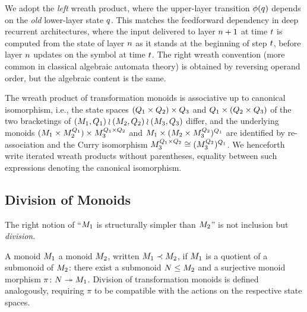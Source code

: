 \documentclass{article}
\begin{document}
\begin{remark}
We adopt the \emph{left} wreath product, where the upper-layer transition $\phi(q)$ depends on the \emph{old} lower-layer state $q$. 
This matches the feedforward dependency in deep recurrent architectures, where the input delivered to layer $n+1$ at time $t$ is computed from the state of layer $n$ as it stands at the beginning of step $t$, before layer $n$ updates on the symbol at time $t$. 
The right wreath convention (more common in classical algebraic automata theory) is obtained by reversing operand order, but the algebraic content is the same.
\end{remark}


\begin{remark}\label{rem:wreath-associativity}
The wreath product of transformation monoids is associative up to canonical isomorphism, i.e., the state spaces $(Q_1 \times Q_2) \times Q_3$ and $Q_1 \times (Q_2 \times Q_3)$ of the two bracketings of $(M_1, Q_1) \wr (M_2, Q_2) \wr (M_3, Q_3)$ differ, and the underlying monoids $(M_1 \times M_2^{Q_1}) \times M_3^{Q_1 \times Q_2}$ and $M_1 \times (M_2 \times M_3^{Q_2})^{Q_1}$ are identified by re-association and the Curry isomorphism $M_3^{Q_1 \times Q_2} \cong (M_3^{Q_2})^{Q_1}$. 
We henceforth write iterated wreath products without parentheses, equality between such expressions denoting the canonical isomorphism.
\end{remark}

\subsection{Division of Monoids}

The right notion of ``$M_1$ is structurally simpler than $M_2$'' is not inclusion but \emph{division}.

\begin{definition}\label{def:division}
A monoid $M_1$  a monoid $M_2$, written $M_1 \prec M_2$, if $M_1$ is a quotient of a submonoid of $M_2$: there exist a submonoid $N \leq M_2$ and a surjective monoid morphism $\pi \colon N \twoheadrightarrow M_1$. 
Division of transformation monoids is defined analogously, requiring $\pi$ to be compatible with the actions on the respective state spaces.
\end{definition}
\end{document}
